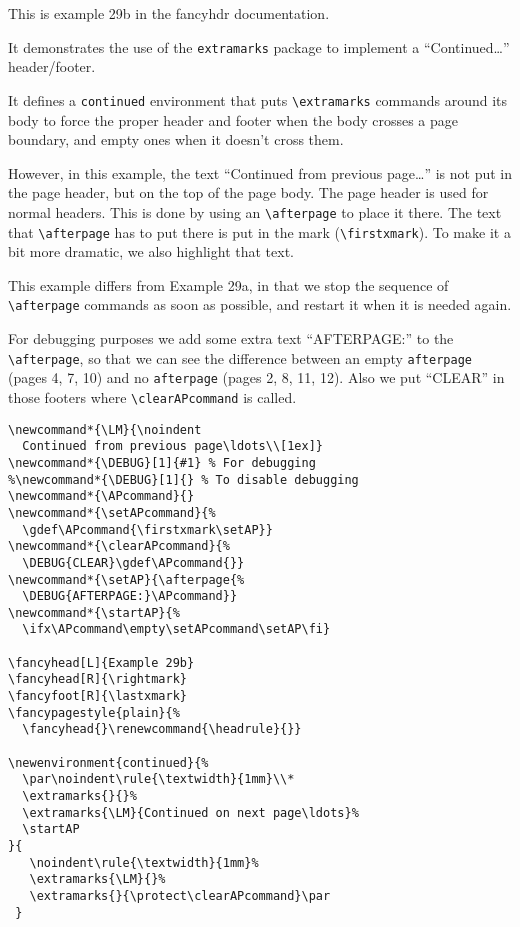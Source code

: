 \documentclass{report}
\newcommand*{\LM}{\noindent
  Continued from previous page\ldots\\[1ex]}
\newcommand*{\DEBUG}[1]{#1} %
\newcommand*{\APcommand}{}
\newcommand*{\setAPcommand}{%
  \gdef\APcommand{\firstxmark\setAP}}
\newcommand*{\clearAPcommand}{%
  \DEBUG{CLEAR}\gdef\APcommand{}}
\newcommand*{\setAP}{\afterpage{%
  \DEBUG{AFTERPAGE:}\APcommand}}
\newcommand*{\startAP}{%
  \ifx\APcommand\empty\setAPcommand\setAP\fi}
\begin{document}
\tableofcontents

\thispagestyle{plain}

\bigskip

\noindent
\begin{boxedminipage}{\textwidth}
This is example 29b in the fancyhdr documentation.

It demonstrates the use of the \texttt{extramarks} package to implement
a ``Continued\ldots'' header/footer.

It defines a \texttt{continued} environment that puts \verb|\extramarks| commands around its body to force the proper header and footer when the body crosses a page boundary, and empty ones when it doesn't cross them.

However, in this example, the text ``Continued from previous page\ldots'' is not put in the page header, but on the top of the page body. The page header is used for normal headers. This is done by using an \verb|\afterpage| to place it there. The text that \verb|\afterpage| has to put there is put in the mark (\verb|\firstxmark|). To make it a bit more dramatic, we also highlight that text.

This example differs from Example 29a, in that we stop the sequence of \verb|\afterpage| commands as soon as possible, and restart it when it is needed again.
\end{boxedminipage}

\noindent
\begin{boxedminipage}{\textwidth}
For debugging purposes we add some extra text ``AFTERPAGE:'' to the \verb|\afterpage|, so that we can see the difference between an empty \texttt{afterpage} (pages 4, 7, 10) and no \texttt{afterpage} (pages 2, 8, 11, 12). Also we put ``CLEAR'' in those footers where \verb|\clearAPcommand| is called.

\begin{verbatim}
\newcommand*{\LM}{\noindent
  Continued from previous page\ldots\\[1ex]}
\newcommand*{\DEBUG}[1]{#1} % For debugging
%\newcommand*{\DEBUG}[1]{} % To disable debugging
\newcommand*{\APcommand}{}
\newcommand*{\setAPcommand}{%
  \gdef\APcommand{\firstxmark\setAP}}
\newcommand*{\clearAPcommand}{%
  \DEBUG{CLEAR}\gdef\APcommand{}}
\newcommand*{\setAP}{\afterpage{%
  \DEBUG{AFTERPAGE:}\APcommand}}
\newcommand*{\startAP}{%
  \ifx\APcommand\empty\setAPcommand\setAP\fi}

\fancyhead[L]{Example 29b}
\fancyhead[R]{\rightmark}
\fancyfoot[R]{\lastxmark}
\fancypagestyle{plain}{%
  \fancyhead{}\renewcommand{\headrule}{}}

\newenvironment{continued}{%
  \par\noindent\rule{\textwidth}{1mm}\\*
  \extramarks{}{}%
  \extramarks{\LM}{Continued on next page\ldots}%
  \startAP
}{
   \noindent\rule{\textwidth}{1mm}%
   \extramarks{\LM}{}%
   \extramarks{}{\protect\clearAPcommand}\par
 }
\end{verbatim}

\end{boxedminipage}
\end{document}
